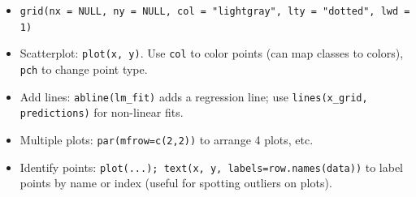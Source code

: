 \documentclass[11pt]{article}
\begin{document}
\begin{itemize}
\begin{itemize}
  \item \texttt{grid(nx = NULL, ny = NULL,
        col = "lightgray",
        lty = "dotted",
        lwd = 1)}  %
\end{itemize}

    \begin{itemize}
        \item Scatterplot: \verb|plot(x, y)|. Use \verb|col| to color points (can map classes to colors), \verb|pch| to change point type.
        \item Add lines: \verb|abline(lm_fit)| adds a regression line; use \verb|lines(x_grid, predictions)| for non-linear fits.
        \item Multiple plots: \verb|par(mfrow=c(2,2))| to arrange 4 plots, etc.
        \item Identify points: \verb|plot(...); text(x, y, labels=row.names(data))| to label points by name or index (useful for spotting outliers on plots).
    \end{itemize}
\end{itemize}
\end{document}
